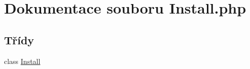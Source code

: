 \hypertarget{_install_8php}{\section{Dokumentace souboru Install.\-php}
\label{_install_8php}
}
\subsection*{Třídy}
\begin{DoxyCompactItemize}
\item 
class \hyperlink{class_install}{Install}
\end{DoxyCompactItemize}
